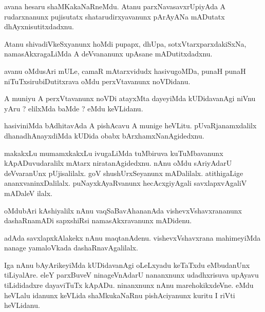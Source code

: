 \documentclass{article}
\begin{document}
\begin{mn}
avana hesaru shaMKakaNaRneMdu. Atanu parxNavasavxrUpiyAda A rudarxnanunx 
pujisutatx shatarudirxyavanunx pArAyANa mADutatx dhAyxnisutitxdadxnu.
\end{mn}

\begin{mn}
Atanu shivadiVkeSxyanunx hoMdi pupapx, dhUpa, sotxVtarxparxdakiSxNa, namasAkxragaLiMda A 
deVvananunx upAsane mADutitxdadxnu.
\end{mn}

\begin{mn}
avanu oMdusAri mULe, camaR mAtarxvidudx hasivugoMDa, punaH punaH niTuTxsirubiDutitxrava oMdu 
perxVtavanunx noVDidanu.
\end{mn}

\begin{mn}
A muniyu A perxVtavanunx noVDi atayxMta dayeyiMda kUDidavanAgi niVnu yAru ? elilxMda baMde ? eMdu 
keVLidanu.
\end{mn}

\begin{mn}
hasiviniMda bAdhitavAda A pishAcavu A munige heVLitu. pUvaRjanamxdalilx dhanadhAnayxdiMda kUDida 
obabx bArxhamxNanAgidedxnu.
\end{mn}

\begin{mn}
makakxLu mumamxkakxLu ivugaLiMda tuMbiruva kuTuMbavanunx kApADuvudaralilx mAtarx 
niratanAgidedxnu. nAnu oMdu sAriyAdarU deVvaranUnx pUjisalilalx. goV shushUrxSeyanunx 
mADalilalx. atithigaLige ananxvaninxDalilalx. puNayxkAyaRvanunx hecAcxgiyAgali savxlapxvAgaliV 
mADaleV ilalx. 
\end{mn}

\begin{mn}
oMdubAri kAshiyalilx nAnu vaqSaBavAhananAda vishevxVshavxrananunx dashaRnamADi sapxshiRsi 
namasAkxravanunx mADidenu.
\end{mn}

\begin{mn}
adAda savxlapxkAlakekx nAnu maqtanAdenu. vishevxVshavxrana mahimeyiMda nanage yamaloVkada 
dashaRnavAgalilalx.
\end{mn}

\begin{mn}
Iga nAnu bAyArikeyiMda kUDidavanAgi oLeLxyadu keTaTxdu eMbudanUnx tiLiyalAre. eleY parxBuveV 
ninageVnAdarU nananxnunx udadhxrisuva upAyavu tiLididadxre dayaviTuTx kApADu. ninanxnunx nAnu 
marehokikxdeVne. eMdu heVLalu idanunx keVLida shaMkukaNaRnu pishAciyanunx kuritu I riVti heVLidanu.
\end{mn}
\end{document}
